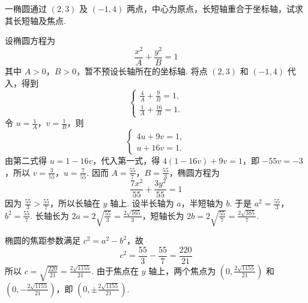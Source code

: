 \documentclass[UTF8,a4paper,oneside,11pt]{ctexbook}
\begin{document}
\begin{problem}
一椭圆通过 \(\left( 2,3 \right)\) 及 \(\left( -1,4 \right)\) 两点，中心为原点，长短轴重合于坐标轴，试求其长短轴及焦点.
\end{problem}

\begin{solution}
设椭圆方程为
\[
\frac{x^{2}}{A}+\frac{y^{2}}{B}=1
\]
其中 \(A>0\)，\(B>0\)，暂不预设长轴所在的坐标轴. 将点 \((2,3)\) 和 \((-1,4)\) 代入，得到
\[
    \begin{cases}
    \frac{4}{A}+\frac{9}{B}=1,\\
    \frac{1}{A}+\frac{16}{B}=1.
    \end{cases}
\]
令 \(u=\frac{1}{A}\)，\(v=\frac{1}{B}\)，则
\[
\begin{cases}
4u+9v=1,\\
u+16v=1.
\end{cases}
\]
由第二式得 \(u=1-16v\)，代入第一式，得 \(4(1-16v)+9v=1\)，即 \(-55v=-3\)，所以 \(v=\frac{3}{55}\)，\(u=\frac{7}{55}\). 因而 \(A=\frac{55}{7}\)，\(B=\frac{55}{3}\)，椭圆方程为
\[
\frac{7x^{2}}{55}+\frac{3y^{2}}{55}=1
\]
因为 \(\frac{55}{3}>\frac{55}{7}\)，所以长轴在 \(y\) 轴上. 设半长轴为 \(a\)，半短轴为 \(b\). 于是 \(a^{2}=\frac{55}{3}\)，\(b^{2}=\frac{55}{7}\). 长轴长为 \(2a=2\sqrt{\frac{55}{3}}=\frac{2\sqrt{165}}{3}\)，短轴长为 \(2b=2\sqrt{\frac{55}{7}}=\frac{2\sqrt{385}}{7}\).

椭圆的焦距参数满足 \(c^{2}=a^{2}-b^{2}\)，故
\[
c^{2}=\frac{55}{3}-\frac{55}{7}=\frac{220}{21}
\]
所以 \(c=\sqrt{\frac{220}{21}}=\frac{2\sqrt{1155}}{21}\).
由于焦点在 \(y\) 轴上，两个焦点为 \(\left(0,\frac{2\sqrt{1155}}{21}\right)\) 和 \(\left(0,-\frac{2\sqrt{1155}}{21}\right)\)，即 \(\left(0,\pm\frac{2\sqrt{1155}}{21}\right)\).
\end{solution}

\end{document}
